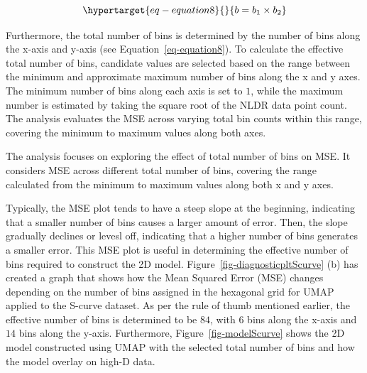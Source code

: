 \documentclass[
  12pt]{article}
\begin{document}
\begin{equation}\protect\hypertarget{eq-equation8}{}{
b = b_1 \times b_2
}\label{eq-equation8}\end{equation}

Furthermore, the total number of bins is determined by the number of
bins along the x-axis and y-axis (see Equation~\ref{eq-equation8}). To
calculate the effective total number of bins, candidate values are
selected based on the range between the minimum and approximate maximum
number of bins along the x and y axes. The minimum number of bins along
each axis is set to \(1\), while the maximum number is estimated by
taking the square root of the NLDR data point count. The analysis
evaluates the MSE across varying total bin counts within this range,
covering the minimum to maximum values along both axes.

The analysis focuses on exploring the effect of total number of bins on
MSE. It considers MSE across different total number of bins, covering
the range calculated from the minimum to maximum values along both x and
y axes.

Typically, the MSE plot tends to have a steep slope at the beginning,
indicating that a smaller number of bins causes a larger amount of
error. Then, the slope gradually declines or levesl off, indicating that
a higher number of bins generates a smaller error. This MSE plot is
useful in determining the effective number of bins required to construct
the 2D model. Figure~\ref{fig-diagnosticpltScurve} (b) has created a
graph that shows how the Mean Squared Error (MSE) changes depending on
the number of bins assigned in the hexagonal grid for UMAP applied to
the S-curve dataset. As per the rule of thumb mentioned earlier, the
effective number of bins is determined to be \(84\), with \(6\) bins
along the x-axis and \(14\) bins along the y-axis. Furthermore,
Figure~\ref{fig-modelScurve} shows the 2D model constructed using UMAP
with the selected total number of bins and how the model overlay on
high-D data.
\end{document}
